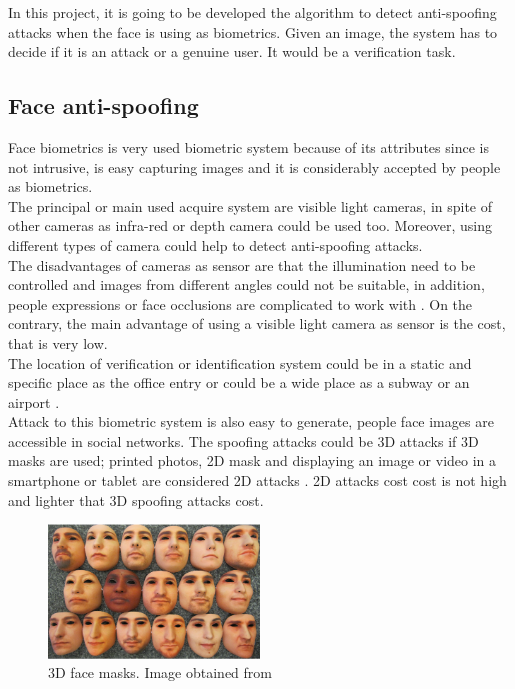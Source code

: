 In this project, it is going to be developed the algorithm to detect anti-spoofing attacks when the face is using as biometrics. Given an image, the system has to decide if it is an attack or a genuine user. It would be a verification task.\\

\subsection{Face anti-spoofing}
Face biometrics is very used biometric system because of its attributes since is not intrusive, is easy capturing images and it is considerably accepted by people as biometrics. \\

The principal or main used acquire system are visible light cameras, in spite of other cameras as infra-red or depth camera could be used too. Moreover, using different types of camera could help to detect anti-spoofing attacks.\\

The disadvantages of cameras as sensor are that the illumination need to be controlled and images from different angles could not be suitable, in addition, people expressions or face occlusions are complicated to work with \cite{survey2,2d_3d_face}. On the contrary, the main advantage of using a visible light camera as sensor is the cost, that is very low. \\

The location of verification or identification system could be in a static and specific place as the office entry or could be a wide place as a subway or an airport \cite{survey2}.\\

Attack to this biometric system is also easy to generate, people face images are accessible in social networks. The spoofing attacks could be 3D attacks if 3D masks are used; printed photos, 2D mask and displaying an image or video in a smartphone or tablet are considered 2D attacks \cite{2d_3d_face}. 2D attacks cost cost is not high \cite{distorsion} and lighter that 3D spoofing attacks cost.\\

\begin{figure}[htb]
\centering
\includegraphics[width=0.5\textwidth]{images_miscelaneus/fig_masks.png}
\caption{3D face masks. Image obtained from \cite{3dmask}} \label{fig:3dMasks}
\end{figure}

